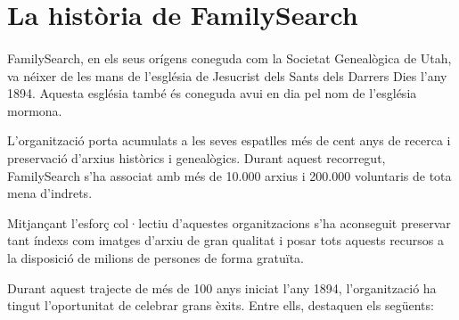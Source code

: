 \section{La història de FamilySearch}

    \paragraph{}
    FamilySearch, en els seus orígens coneguda com la Societat Genealògica de Utah, va néixer de les mans de l'església de Jesucrist dels Sants dels Darrers Dies l'any 1894. Aquesta església també és coneguda avui en dia pel nom de l'església mormona.

    L’organització porta acumulats a les seves espatlles més de cent anys de recerca i preservació d’arxius històrics i genealògics. Durant aquest recorregut, FamilySearch s’ha associat amb més de 10.000 arxius i 200.000 voluntaris de tota mena d’indrets.

    Mitjançant l’esforç col·lectiu d’aquestes organitzacions s’ha aconseguit preservar tant índexs com imatges d’arxiu de gran qualitat i posar tots aquests recursos a la disposició de milions de persones de forma gratuïta.

    Durant aquest trajecte de més de 100 anys iniciat l'any 1894, l'organització ha tingut l'oportunitat de celebrar grans èxits. Entre ells, destaquen els següents:

